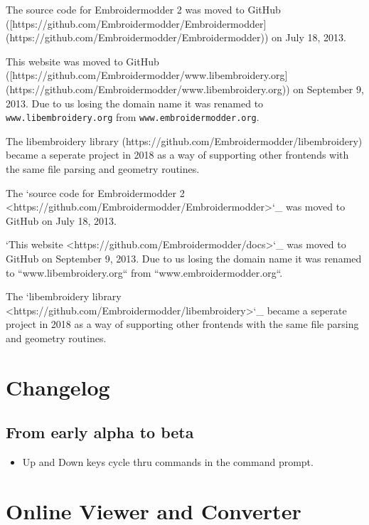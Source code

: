 
The source code for Embroidermodder
2 was moved to GitHub ([https://github.com/Embroidermodder/Embroidermodder](https://github.com/Embroidermodder/Embroidermodder)) on July 18, 2013.

This website was moved to
GitHub ([https://github.com/Embroidermodder/www.libembroidery.org](https://github.com/Embroidermodder/www.libembroidery.org)) on September 9, 2013. Due to us losing the domain name it was renamed to
\texttt{www.libembroidery.org} from \texttt{www.embroidermodder.org}.

The libembroidery library (https://github.com/Embroidermodder/libembroidery)
became a seperate project in 2018 as a way of supporting other frontends with the
same file parsing and geometry routines.

The `source code for Embroidermodder 2 <https://github.com/Embroidermodder/Embroidermodder>`_
was moved to GitHub on July 18, 2013.

`This website <https://github.com/Embroidermodder/docs>`_ was moved
to GitHub on September 9, 2013. Due to us losing the domain name it was renamed
to ``www.libembroidery.org`` from ``www.embroidermodder.org``.

The `libembroidery library <https://github.com/Embroidermodder/libembroidery>`_
became a seperate project in 2018 as a way of supporting other frontends with
the same file parsing and geometry routines.

\section{Changelog}

\subsection{From early alpha to beta}

\begin{itemize}
\item Up and Down keys cycle thru commands in the command prompt.
\end{itemize}

\section{Online Viewer and Converter}

